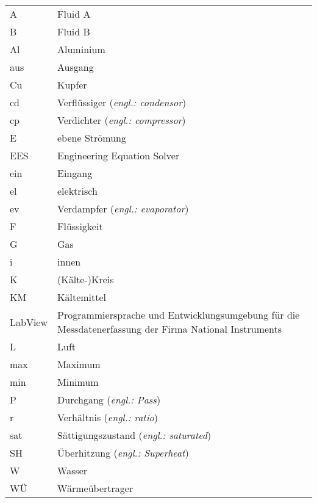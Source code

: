 \begin{onehalfspacing}
\begin{longtable}[h]{p{} p{}}
		A & Fluid A \\
		B & Fluid B \\
		Al & Aluminium\\ 
		aus & Ausgang\\		
		Cu & Kupfer \\
		cd & Verflüssiger (\emph{engl.: condensor})\\
		cp & Verdichter (\emph{engl.: compressor})\\ 
		E & ebene Strömung \\   
		EES & Engineering Equation Solver \\
		ein & Eingang \\
		el & elektrisch \\
		ev & Verdampfer (\emph{engl.: evaporator})\\
		F & Flüssigkeit\\	
		G & Gas \\
		i & innen \\
		K & (Kälte-)Kreis\\
		KM & Kältemittel\\
		LabView & Programmiersprache und Entwicklungsumgebung für die Messdatenerfassung der Firma National Instruments\\
		L & Luft\\
		max & Maximum \\
		min & Minimum \\
		P & Durchgang (\emph{engl.: Pass})\\
		r & Verhältnis (\emph{engl.: ratio})\\
		sat & Sättigungszustand (\emph{engl.: saturated})\\
		SH & Überhitzung (\emph{engl.: Superheat})\\
		W & Wasser \\
		WÜ & Wärmeübertrager \\
		
\end{longtable}
\end{onehalfspacing}
